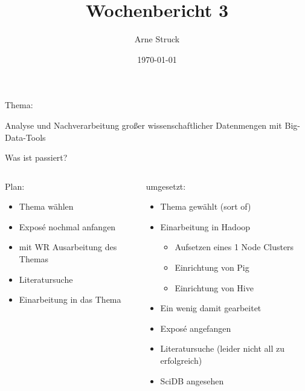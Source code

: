\documentclass{beamer}
\title{Wochenbericht 3}
\subtitle{}
\author{Arne Struck}
\institute{Universität Hamburg, Fachschaft Informatik, Abschlussarbeitenseminar}
\date{\today}
\begin{document}
\begin{frame}
\maketitle
\end{frame}
\begin{frame}{Thema:}
	\begin{block}{}
		Analyse und Nachverarbeitung großer wissenschaftlicher Datenmengen mit Big-Data-Tools
	\end{block}
\end{frame}


\begin{frame}{Was ist passiert?}
\begin{columns}[t]
    \begin{column}{.5\textwidth}      	
      	\begin{block}{Plan:}
        	\begin{itemize}
				\item Thema wählen
	   			\item Exposé nochmal anfangen
		        \item mit WR Ausarbeitung des Themas
				\item Literatursuche
		    	\item Einarbeitung in das Thema
			\end{itemize}
    	\end{block}
    \end{column}
	\begin{column}{.5\textwidth}
		\uncover<2> {
		\begin{block}{umgesetzt:}
        	\begin{itemize}
        		\item Thema gewählt (sort of)
	        	\item Einarbeitung in Hadoop
	        	\begin{itemize}
	        		\item Aufsetzen eines 1 Node Clusters
	        		\item Einrichtung von Pig
	        		\item Einrichtung von Hive 
	        	\end{itemize}
	        	\item Ein wenig damit gearbeitet
    	    	\item Exposé angefangen
    	    	\item Literatursuche (leider nicht all zu erfolgreich)
    	    	\item SciDB angesehen
        	\end{itemize}
		\end{block}
		}
	\end{column}
\end{columns}
\end{frame}
\end{document}
